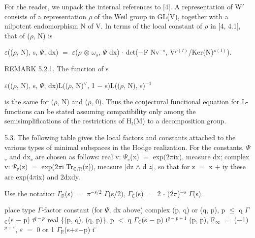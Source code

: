 \documentclass[10pt,twoside]{article}
\begin{document}
For the reader, we unpack the internal references to [4]. A representation of W\ensuremath{′} consists of a representation \ensuremath{ρ} of the Weil group in GL(V), together with a nilpotent endomorphism N of V. In terms of the local constant of \ensuremath{ρ} in [4, 4.1], that of (\ensuremath{ρ}, N) is\par
\ensuremath{ε}((\ensuremath{ρ}, N), s, \ensuremath{Ψ}, dx) \ensuremath{=} \ensuremath{ε}(\ensuremath{ρ} \ensuremath{⊗} \ensuremath{ω}\ensuremath{_{s}}, \ensuremath{Ψ} dx) \ensuremath{·} det(\ensuremath{−}F Nv\ensuremath{^{−s}}, V\ensuremath{^{ρ(I)}}/Ker(N)\ensuremath{^{ρ(I)}}).\par
REMARK 5.2.1. The function of s\par
\ensuremath{ε}((\ensuremath{ρ}, N), s, \ensuremath{Ψ}, dx)L((\ensuremath{ρ}, N)\ensuremath{^{∨}}, 1 \ensuremath{−} s)L((\ensuremath{ρ}, N), s)\ensuremath{^{-1}}\par
is the same for (\ensuremath{ρ}, N) and (\ensuremath{ρ}, 0). Thus the conjectural functional equation for L-functions can be stated assuming compatibility only among the semisimplifications of the restrictions of H\ensuremath{_{l}}(M) to a decomposition group.\par
5.3. The following table gives the local factors and constants attached to the various types of minimal subspaces in the Hodge realization. For the constants, \ensuremath{Ψ}\ensuremath{_{v}} and dx\ensuremath{_{v}} are chosen as follows: real v: \ensuremath{Ψ}\ensuremath{_{v}}(x) \ensuremath{=} exp(2\ensuremath{π}ix), measure dx; complex v: \ensuremath{Ψ}\ensuremath{_{v}}(z) \ensuremath{=} exp(2\ensuremath{π}i Tr\ensuremath{_{ℂ/ℝ}}(z)), measure \ensuremath{|}dz \ensuremath{∧} d \ensuremath{\bar{z}}\ensuremath{|}, so that for z \ensuremath{=} x \ensuremath{+} iy these are exp(4\ensuremath{π}ix) and 2dxdy.\par
Use the notation \ensuremath{Γ}\ensuremath{_{ℝ}}(s) \ensuremath{=} \ensuremath{π}\ensuremath{^{−s/2}} \ensuremath{Γ}(s/2), \ensuremath{Γ}\ensuremath{_{ℂ}}(s) \ensuremath{=} 2 \ensuremath{·} (2\ensuremath{π})\ensuremath{^{−s}} \ensuremath{Γ}(s).\par
place       type                                      \ensuremath{Γ}-factor          constant (for \ensuremath{Ψ}, dx above) complex     (p, q) or (q, p), p \ensuremath{≤} q                   \ensuremath{Γ}\ensuremath{_{ℂ}}(s \ensuremath{−} p)       i\ensuremath{^{q−p}} real        \{(p, q), (q, p)\}, p \ensuremath{<} q                   \ensuremath{Γ}\ensuremath{_{ℂ}}(s \ensuremath{−} p)       i\ensuremath{^{q−p+1}} (p, p), F\ensuremath{_{∞}} \ensuremath{=} (\ensuremath{−}1)\ensuremath{^{p+ε}}, \ensuremath{ε} \ensuremath{=} 0 or 1     \ensuremath{Γ}\ensuremath{_{ℝ}}(s\ensuremath{+}\ensuremath{ε}\ensuremath{−}p)       i\ensuremath{^{ε}}\par
\end{document}

